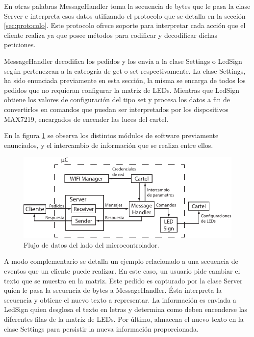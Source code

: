 En otras palabras MessageHandler toma la secuencia de bytes que le pasa la clase Server e interpreta esos datos utilizando el protocolo que se detalla en la sección \ref{sec:protocolo}.
Este protocolo ofrece soporte para interpretar cada acción que el cliente realiza ya que posee métodos para codificar y decodificar dichas peticiones.

MessageHandler decodifica los pedidos y los envía a la clase Settings o LedSign según pertenezcan a la cateogría de get o set respectivamente.
La clase Settings, ha sido enunciada previamente en esta sección, la misma se encarga de todos los pedidos que no requieran configurar la matriz de LEDs.
Mientras que LedSign obtiene los valores de configuración del tipo set y procesa los datos a fin de convertirlos en comandos que puedan ser interpretados por los dispositivos MAX7219, encargados de encender las luces del cartel.

En la figura \ref{fig:flujo_de_datos} se observa los distintos módulos de software previamente enunciados, y el intercambio de información que se realiza entre ellos.


\begin{figure}[!ht]
	\centering
	\includegraphics[width=1\linewidth]{imagenes/diagrama-bloque.pdf}
	\caption{Flujo de datos del lado del microcontrolador.}
	\label{fig:flujo_de_datos}
\end{figure}

A modo complementario se detalla un ejemplo relacionado a una secuencia de eventos que un cliente puede realizar.
En este caso, un usuario pide cambiar el texto que se muestra en la matriz. Este pedido es capturado por la clase Server quien le pasa la secuencia de bytes a MessageHandler.
Ésta interpreta la secuencia y obtiene el nuevo texto a representar. La información es enviada a LedSign quien desglosa el texto en letras y determina como deben encenderse las diferentes filas de la matriz de LEDs.
Por último, almacena el nuevo texto en la clase Settings para persistir la nueva información proporcionada.

